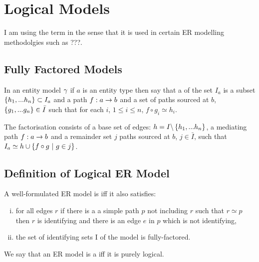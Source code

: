 
\section{Logical Models}
I am using the term  in the sense that it is used in certain ER modelling methodolgies such as ???.
\subsection{Fully Factored Models}

\begin{definition}
In an entity model $\gamma$ if $a$ is an entity type then say that
a  of the set $I_a$ is a subset $\left\{h_1,...h_n\right\} \subset I_a$ 
and a  path $f:a \rightarrow b$ and a set of paths sourced at $b$, $\left\{g_1,...g_n\right\} \in \bar{I}$
such that for each $i$, $1 \leq i \leq n$, $f \circ g_i \simeq h_i$. 
\end{definition}

The factorisation consists  
of a base set of edges: $h=I \backslash \left\{h_1,...h_n\right\}$, a mediating path $f:a \rightarrow b$ and a remainder 
set $j$ paths sourced at $b$, $j \in \bar{I}$, 
such that $I_a \simeq h \cup \left\{f\circ g \ \middle|\ g \in j\right\}$.


\subsection{Definition of Logical ER Model}
\begin{definition}
A well-formulated ER model is   iff it 
also satisfies:
\begin{enumerate}[(i)]
\item
for all edges $r$ if there is a
a simple path $p$  not including $r$ such that
 $r \simeq p$  then $r$ is identifying and there is an edge $e$ in $p$ which is not identifying,
\item the set of identifying sets I of the model is fully-factored.
\end{enumerate} 
\end{definition}

\noindent
We say that an ER model is a  iff it is purely logical.

